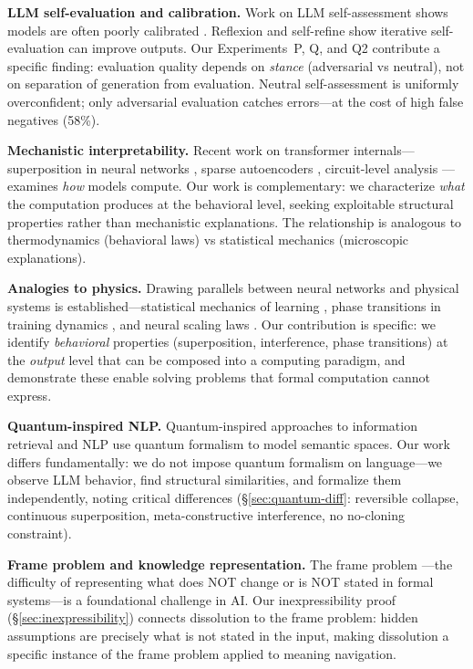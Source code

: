 \documentclass[11pt,a4paper]{article}
\begin{document}
\textbf{LLM self-evaluation and calibration.} Work on LLM self-assessment shows models are often poorly calibrated \citep{kadavath2022language,lin2022teaching}. Reflexion \citep{shinn2023reflexion} and self-refine \citep{madaan2023self} show iterative self-evaluation can improve outputs. Our Experiments~P, Q, and Q2 contribute a specific finding: evaluation quality depends on \emph{stance} (adversarial vs neutral), not on separation of generation from evaluation. Neutral self-assessment is uniformly overconfident; only adversarial evaluation catches errors---at the cost of high false negatives (58\%).

\textbf{Mechanistic interpretability.} Recent work on transformer internals---superposition in neural networks \citep{elhage2022toy}, sparse autoencoders \citep{cunningham2023sparse}, circuit-level analysis \citep{conmy2023towards}---examines \emph{how} models compute. Our work is complementary: we characterize \emph{what} the computation produces at the behavioral level, seeking exploitable structural properties rather than mechanistic explanations. The relationship is analogous to thermodynamics (behavioral laws) vs statistical mechanics (microscopic explanations).

\textbf{Analogies to physics.} Drawing parallels between neural networks and physical systems is established---statistical mechanics of learning \citep{bahri2020statistical}, phase transitions in training dynamics \citep{power2022grokking}, and neural scaling laws \citep{kaplan2020scaling}. Our contribution is specific: we identify \emph{behavioral} properties (superposition, interference, phase transitions) at the \emph{output} level that can be composed into a computing paradigm, and demonstrate these enable solving problems that formal computation cannot express.

\textbf{Quantum-inspired NLP.} Quantum-inspired approaches to information retrieval and NLP \citep{vanrijsbergen2004geometry,melucci2015introduction} use quantum formalism to model semantic spaces. Our work differs fundamentally: we do not impose quantum formalism on language---we observe LLM behavior, find structural similarities, and formalize them independently, noting critical differences (\S\ref{sec:quantum-diff}: reversible collapse, continuous superposition, meta-constructive interference, no no-cloning constraint).

\textbf{Frame problem and knowledge representation.} The frame problem \citep{mccarthy1969some}---the difficulty of representing what does NOT change or is NOT stated in formal systems---is a foundational challenge in AI. Our inexpressibility proof (\S\ref{sec:inexpressibility}) connects dissolution to the frame problem: hidden assumptions are precisely what is not stated in the input, making dissolution a specific instance of the frame problem applied to meaning navigation.
\end{document}
